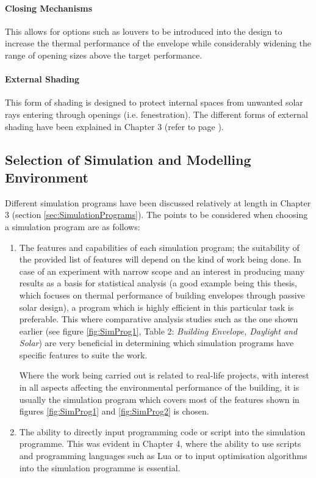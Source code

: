 \paragraph{Closing Mechanisms}\mbox{}

This allows for options such as louvers to be introduced into the design to increase the thermal performance of the envelope while considerably widening the range of opening sizes above the target performance.

\paragraph{External Shading}\mbox{}

This form of shading is designed to protect internal spaces from unwanted solar rays entering through openings (i.e. fenestration). The different forms of external shading have been explained in Chapter 3 (refer to page \pageref{Shading}).

\subsection{Selection of Simulation and Modelling Environment}

Different simulation programs have been discussed relatively at length in Chapter 3 (section \ref{sec:SimulationPrograms}). The points to be considered when choosing a simulation program are as follows:

\begin{enumerate}
	\item The features and capabilities of each simulation program; the suitability of the provided list of features will depend on the kind of work being done. In case of an experiment with narrow scope and an interest in producing many results as a basis for statistical analysis (a good example being this thesis, which focuses on thermal performance of building envelopes through passive solar design), a program which is highly efficient in this particular task is preferable. This where comparative analysis studies such as the one shown earlier (see figure \ref{fig:SimProg1}, Table 2: \emph{Building Envelope, Daylight and Solar}) are very beneficial in determining which simulation programs have specific features to suite the work.

		Where the work being carried out is related to real-life projects, with interest in all aspects affecting the environmental performance of the building, it is usually the simulation program which covers most of the features shown in figures \ref{fig:SimProg1} and \ref{fig:SimProg2} is chosen.
	
	\item The ability to directly input programming code or script into the simulation programme. This was evident in Chapter 4, where the ability to use scripts and programming languages such as Lua or to input optimisation algorithms into the simulation programme is essential.
\end{enumerate}

